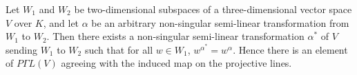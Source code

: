Let $W_1$ and $W_2$ be two-dimensional subspaces of a three-dimensional vector space $V$ over $K$, and let $\alpha$ be an arbitrary non-singular semi-linear transformation from $W_1$ to $W_2$. Then there exists a non-singular semi-linear transformation $\alpha^*$ of $V$ sending $W_1$ to $W_2$ such that for all $w \in W_1$, $w^{\alpha^*} = w^\alpha$. Hence there is an element of $P\Gamma L(V)$ agreeing with the induced map on the projective lines.
